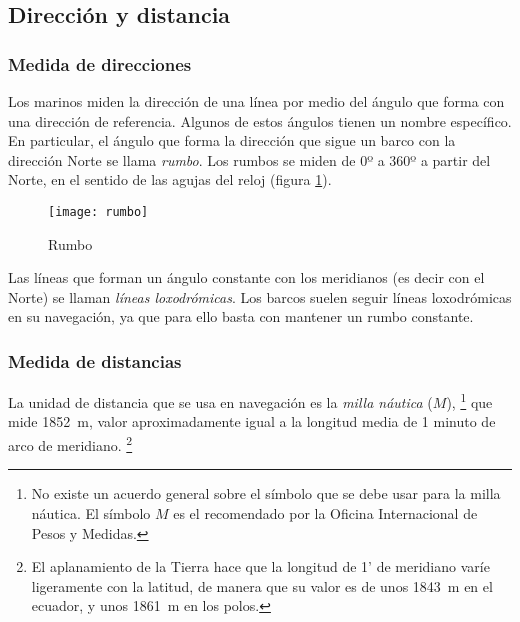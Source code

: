 \subsection{Dirección y distancia }

\subsubsection{Medida de direcciones}


Los marinos miden la dirección de una línea por medio del ángulo que forma con una dirección de referencia. Algunos de estos ángulos tienen un nombre específico. En particular, el ángulo que forma la dirección que sigue un barco con la dirección Norte se llama \emph{rumbo}.  Los rumbos se miden de 0º a 360º a partir del Norte,  en el sentido de las agujas del reloj (figura \ref{fg:rumbo}).

\begin{figure}[hbtp]
\begin{center}
\texttt{[image: rumbo]}\\
\caption{Rumbo}
\label{fg:rumbo}
\end{center}
\end{figure}

Las líneas que forman un ángulo constante con los meridianos (es decir con el Norte) se llaman \emph{líneas loxodrómicas}. Los barcos suelen seguir líneas loxodrómicas en su navegación, ya que para ello basta con mantener un rumbo constante.

\subsubsection{Medida de distancias}

 
La unidad de distancia que se usa en navegación es la \emph{milla náutica }($M$),%
\footnote{No existe un acuerdo general sobre el símbolo que se debe usar para la milla náutica. El símbolo $M$ es el recomendado por la Oficina Internacional de Pesos y Medidas.}
 que mide 1852~m, valor aproximadamente igual a la longitud media de 1 minuto de arco de meridiano.%
\footnote{El aplanamiento de la Tierra hace que la longitud de 1' de meridiano varíe ligeramente con la latitud, de manera que su valor es de unos 1843~m en el ecuador, y unos 1861~m en los polos.}

